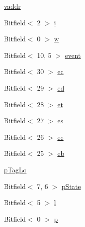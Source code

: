 \begin{DoxyCompactItemize}
\item 
\hyperlink{namespaceMipsISA_ac78d9788b3f9a366df64485c9afaf1b1}{vaddr}
\item 
Bitfield$<$ 2 $>$ \hyperlink{namespaceMipsISA_a9e2da8d060f17746350911ecaaf6bef2}{i}
\item 
Bitfield$<$ 0 $>$ \hyperlink{namespaceMipsISA_a3c9d192cc8aebe4b3d22912a4604e08d}{w}
\item 
Bitfield$<$ 10, 5 $>$ \hyperlink{namespaceMipsISA_aa3b803f4777161a2825178dabfb154f0}{event}
\item 
Bitfield$<$ 30 $>$ \hyperlink{namespaceMipsISA_aef9e65480f75513951d1cfe7127ce65f}{ec}
\item 
Bitfield$<$ 29 $>$ \hyperlink{namespaceMipsISA_a1a2490f62498ec38e66fd27cc2c499a7}{ed}
\item 
Bitfield$<$ 28 $>$ \hyperlink{namespaceMipsISA_a78bc981dd1b5ed8dd75a78683dd8edba}{et}
\item 
Bitfield$<$ 27 $>$ \hyperlink{namespaceMipsISA_aae6a38e5d8f3ef8bdc92464d6232e3ad}{es}
\item 
Bitfield$<$ 26 $>$ \hyperlink{namespaceMipsISA_a0ff44debc310542103aad8c214fa58f3}{ee}
\item 
Bitfield$<$ 25 $>$ \hyperlink{namespaceMipsISA_a1952cd079371dfb5d9c0a41929c2cb4d}{eb}
\item 
\hyperlink{namespaceMipsISA_aec41a80ee79251e407d41c00bc14224e}{pTagLo}
\item 
Bitfield$<$ 7, 6 $>$ \hyperlink{namespaceMipsISA_a04ddba6de71af179f3d9c4bce608261c}{pState}
\item 
Bitfield$<$ 5 $>$ \hyperlink{namespaceMipsISA_a5818de049c10ffd7c1fea7d4dd69ed5c}{l}
\item 
Bitfield$<$ 0 $>$ \hyperlink{namespaceMipsISA_a37d3f683959086eac7bcf24a002a9fb8}{p}
\end{DoxyCompactItemize}
